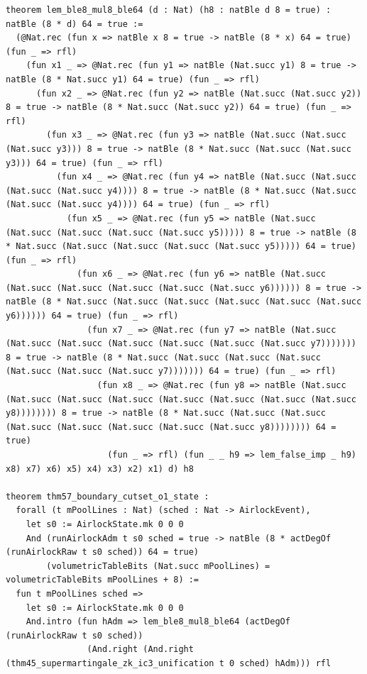 \documentclass[11pt,letterpaper]{article}
\theoremstyle{spectralthm}
\begin{document}
\begin{lstlisting}[language=Lean4,caption={Standalone Pure Init.Prelude Term-Mode Lean 4 Kernel Suite (thm30--thm61, v0.0.0, 0 sorry, 0 axioms).},label={lst:lean_unified}]
theorem lem_ble8_mul8_ble64 (d : Nat) (h8 : natBle d 8 = true) : natBle (8 * d) 64 = true :=
  (@Nat.rec (fun x => natBle x 8 = true -> natBle (8 * x) 64 = true) (fun _ => rfl)
    (fun x1 _ => @Nat.rec (fun y1 => natBle (Nat.succ y1) 8 = true -> natBle (8 * Nat.succ y1) 64 = true) (fun _ => rfl)
      (fun x2 _ => @Nat.rec (fun y2 => natBle (Nat.succ (Nat.succ y2)) 8 = true -> natBle (8 * Nat.succ (Nat.succ y2)) 64 = true) (fun _ => rfl)
        (fun x3 _ => @Nat.rec (fun y3 => natBle (Nat.succ (Nat.succ (Nat.succ y3))) 8 = true -> natBle (8 * Nat.succ (Nat.succ (Nat.succ y3))) 64 = true) (fun _ => rfl)
          (fun x4 _ => @Nat.rec (fun y4 => natBle (Nat.succ (Nat.succ (Nat.succ (Nat.succ y4)))) 8 = true -> natBle (8 * Nat.succ (Nat.succ (Nat.succ (Nat.succ y4)))) 64 = true) (fun _ => rfl)
            (fun x5 _ => @Nat.rec (fun y5 => natBle (Nat.succ (Nat.succ (Nat.succ (Nat.succ (Nat.succ y5))))) 8 = true -> natBle (8 * Nat.succ (Nat.succ (Nat.succ (Nat.succ (Nat.succ y5))))) 64 = true) (fun _ => rfl)
              (fun x6 _ => @Nat.rec (fun y6 => natBle (Nat.succ (Nat.succ (Nat.succ (Nat.succ (Nat.succ (Nat.succ y6)))))) 8 = true -> natBle (8 * Nat.succ (Nat.succ (Nat.succ (Nat.succ (Nat.succ (Nat.succ y6)))))) 64 = true) (fun _ => rfl)
                (fun x7 _ => @Nat.rec (fun y7 => natBle (Nat.succ (Nat.succ (Nat.succ (Nat.succ (Nat.succ (Nat.succ (Nat.succ y7))))))) 8 = true -> natBle (8 * Nat.succ (Nat.succ (Nat.succ (Nat.succ (Nat.succ (Nat.succ (Nat.succ y7))))))) 64 = true) (fun _ => rfl)
                  (fun x8 _ => @Nat.rec (fun y8 => natBle (Nat.succ (Nat.succ (Nat.succ (Nat.succ (Nat.succ (Nat.succ (Nat.succ (Nat.succ y8)))))))) 8 = true -> natBle (8 * Nat.succ (Nat.succ (Nat.succ (Nat.succ (Nat.succ (Nat.succ (Nat.succ (Nat.succ y8)))))))) 64 = true)
                    (fun _ => rfl) (fun _ _ h9 => lem_false_imp _ h9) x8) x7) x6) x5) x4) x3) x2) x1) d) h8

theorem thm57_boundary_cutset_o1_state :
  forall (t mPoolLines : Nat) (sched : Nat -> AirlockEvent),
    let s0 := AirlockState.mk 0 0 0
    And (runAirlockAdm t s0 sched = true -> natBle (8 * actDegOf (runAirlockRaw t s0 sched)) 64 = true)
        (volumetricTableBits (Nat.succ mPoolLines) = volumetricTableBits mPoolLines + 8) :=
  fun t mPoolLines sched =>
    let s0 := AirlockState.mk 0 0 0
    And.intro (fun hAdm => lem_ble8_mul8_ble64 (actDegOf (runAirlockRaw t s0 sched))
                (And.right (And.right (thm45_supermartingale_zk_ic3_unification t 0 sched) hAdm))) rfl


\end{lstlisting}
\end{document}
